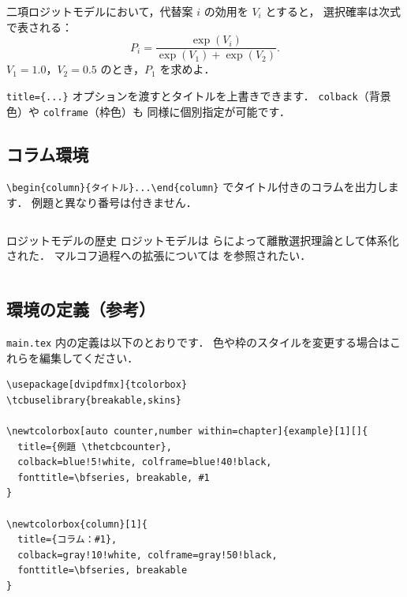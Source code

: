 \begin{example}
  二項ロジットモデルにおいて，代替案 $i$ の効用を $V_i$ とすると，
  選択確率は次式で表される：
  \begin{equation}
    P_i = \frac{\exp(V_i)}{\exp(V_1) + \exp(V_2)}.
  \end{equation}
  $V_1 = 1.0$，$V_2 = 0.5$ のとき，$P_1$ を求めよ．
\end{example}

\begin{example}[title={例題 \thetcbcounter（応用）}]
  \texttt{title=\{...\}} オプションを渡すとタイトルを上書きできます．
  \texttt{colback}（背景色）や \texttt{colframe}（枠色）も
  同様に個別指定が可能です．
\end{example}

\subsection{コラム環境}

\verb|\begin{column}{タイトル}...\end{column}| でタイトル付きのコラムを出力します．
例題と異なり番号は付きません．

\begin{column}{ロジットモデルの歴史}
  ロジットモデルは \citet{Ben-Akiva1985} らによって離散選択理論として体系化された．
  マルコフ過程への拡張については \citet{Akamatsu1996} を参照されたい．
\end{column}

\subsection{環境の定義（参考）}

\texttt{main.tex} 内の定義は以下のとおりです．
色や枠のスタイルを変更する場合はこれらを編集してください．

\begin{verbatim}
\usepackage[dvipdfmx]{tcolorbox}
\tcbuselibrary{breakable,skins}

\newtcolorbox[auto counter,number within=chapter]{example}[1][]{
  title={例題 \thetcbcounter},
  colback=blue!5!white, colframe=blue!40!black,
  fonttitle=\bfseries, breakable, #1
}

\newtcolorbox{column}[1]{
  title={コラム：#1},
  colback=gray!10!white, colframe=gray!50!black,
  fonttitle=\bfseries, breakable
}
\end{verbatim}

